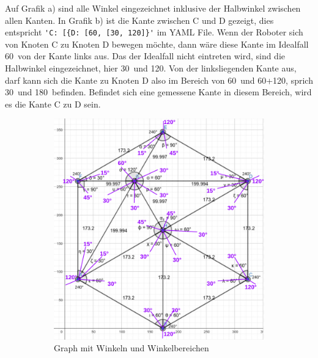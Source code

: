 Auf Grafik a) sind alle Winkel eingezeichnet inklusive der Halbwinkel zwischen allen Kanten. In Grafik b) ist die Kante zwischen C und D gezeigt, dies entspricht \verb|'C: [{D: [60, [30, 120]}'| im YAML File. Wenn der Roboter sich von Knoten C zu Knoten D bewegen möchte, dann wäre diese Kante im Idealfall 60\textdegree\ von der Kante links aus. Das der Idealfall nicht eintreten wird, sind die Halbwinkel eingezeichnet, hier 30\textdegree\ und 120\textdegree. Von der linksliegenden Kante aus, darf kann sich die Kante zu Knoten D also im Bereich von 60\textdegree\ und 60\textdegree+120\textdegree, sprich 30\textdegree\ und 180\textdegree\ befinden. Befindet sich eine gemessene Kante in diesem Bereich, wird es die Kante C zu D sein.

\begin{figure}[H]
\begin{subfigure}{0.62\textwidth}
\includegraphics[width=0.95\linewidth]{assets/informatik-prototyp/graph-angles.png} 
\caption{Graph mit Winkeln und Winkelbereichen}
\label{fig:angled-graph}
\end{subfigure}
\begin{subfigure}{0.38\textwidth}

\end{subfigure}
\end{figure}
